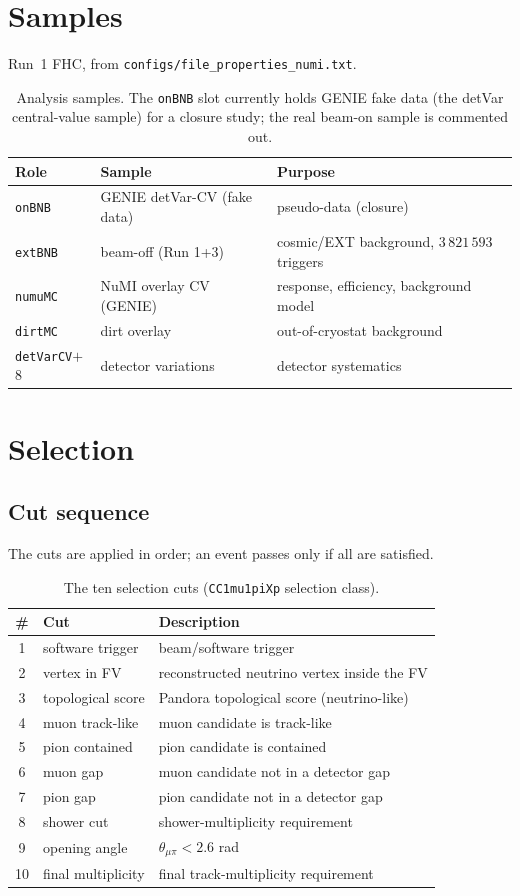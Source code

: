 \documentclass[11pt]{article}
\begin{document}
\section{Samples}
Run~1 FHC, from \texttt{configs/file\_properties\_numi.txt}.
\begin{table}[htbp]\centering
\caption{Analysis samples. The \texttt{onBNB} slot currently holds GENIE fake
data (the detVar central-value sample) for a closure study; the real beam-on
sample is commented out.}
\begin{tabular}{lll}
\toprule
Role & Sample & Purpose\\
\midrule
\texttt{onBNB} & GENIE detVar-CV (fake data) & pseudo-data (closure)\\
\texttt{extBNB} & beam-off (Run 1+3) & cosmic/EXT background, $3\,821\,593$ triggers\\
\texttt{numuMC} & NuMI overlay CV (GENIE) & response, efficiency, background model\\
\texttt{dirtMC} & dirt overlay & out-of-cryostat background\\
\texttt{detVarCV}$+$8 & detector variations & detector systematics\\
\bottomrule
\end{tabular}
\end{table}

\section{Selection}
\subsection{Cut sequence}
The cuts are applied in order; an event passes only if all are satisfied.
\begin{table}[htbp]\centering
\caption{The ten selection cuts (\texttt{CC1mu1piXp} selection class).}
\begin{tabular}{clp{8.2cm}}
\toprule
\# & Cut & Description\\
\midrule
1 & software trigger & beam/software trigger\\
2 & vertex in FV & reconstructed neutrino vertex inside the FV\\
3 & topological score & Pandora topological score (neutrino-like)\\
4 & muon track-like & muon candidate is track-like\\
5 & pion contained & pion candidate is contained\\
6 & muon gap & muon candidate not in a detector gap\\
7 & pion gap & pion candidate not in a detector gap\\
8 & shower cut & shower-multiplicity requirement\\
9 & opening angle & $\theta_{\mu\pi}<2.6$ rad\\
10 & final multiplicity & final track-multiplicity requirement\\
\bottomrule
\end{tabular}
\end{table}
\end{document}
